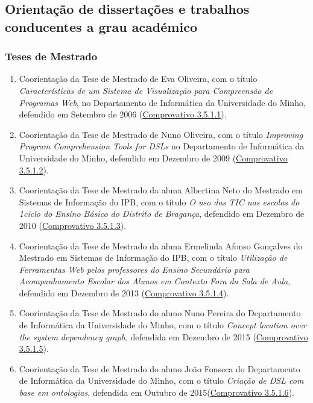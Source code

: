 \documentclass[11pt]{article}
\begin{document}
\subsection{Orientação de dissertações e trabalhos conducentes a grau académico}

\subsubsection{Teses de Mestrado}
\begin{enumerate}
\item {Coorientação da Tese de Mestrado de Eva Oliveira, com o título \emph{Características de um Sistema de Visualização para Compreensão de Programas Web}, no Departamento de Informática da Universidade do Minho, defendido em Setembro de 2006 (\href{run:CoOrientTrabalhos/OrientacaoEva.pdf}{Comprovativo 3.5.1.1}).}
\item {Coorientação da Tese de Mestrado de Nuno Oliveira, com o título \emph{Improving Program Comprehension Tools for DSLs} no Departamento de Informática da Universidade do Minho, defendido em Dezembro de 2009 (\href{run:CoOrientTrabalhos/NunoOliveira.pdf}{Comprovativo 3.5.1.2}).}
\item {Coorientação da Tese de Mestrado da aluna Albertina Neto do Mestrado em Sistemas de Informação do IPB, com o título \emph{O uso das TIC nas escolas do 1\º ciclo do Ensino Básico do Distrito de Bragança}, defendido em Dezembro de 2010 (\href{run:CoOrientTrabalhos/TesesMSI.pdf}{Comprovativo 3.5.1.3}).}
\item {Coorientação da Tese de Mestrado da aluna Ermelinda Afonso Gonçalves do Mestrado em Sistemas de Informação do IPB, com o título \emph{Utilização de Ferramentas Web pelos professores do Ensino Secundário para Acompanhamento Escolar dos Alunos em Contexto Fora da Sala de Aula}, defendido em Dezembro de 2013 (\href{run:CoOrientTrabalhos/TesesMSI.pdf}{Comprovativo 3.5.1.4}).}
\item {Coorientação da Tese de Mestrado do aluno Nuno Pereira do Departamento de Informática da Universidade do Minho, com o título {\em{ Concept location over the system dependency graph}}, defendida em Dezembro de 2015 (\href{run:CoOrientTrabalhos/OrientNunoPereira.pdf}{Comprovativo 3.5.1.5}).}
\item {Coorientação da Tese de Mestrado do aluno João Fonseca do Departamento de Informática da Universidade do Minho, com o título {\em{ Criação de DSL com base em ontologias}}, defendida em Outubro de 2015(\href{run:CoOrientTrabalhos/OrientJoaoFonseca.pdf}{Comprovativo 3.5.1.6}).}

\end{enumerate}
\end{document}
